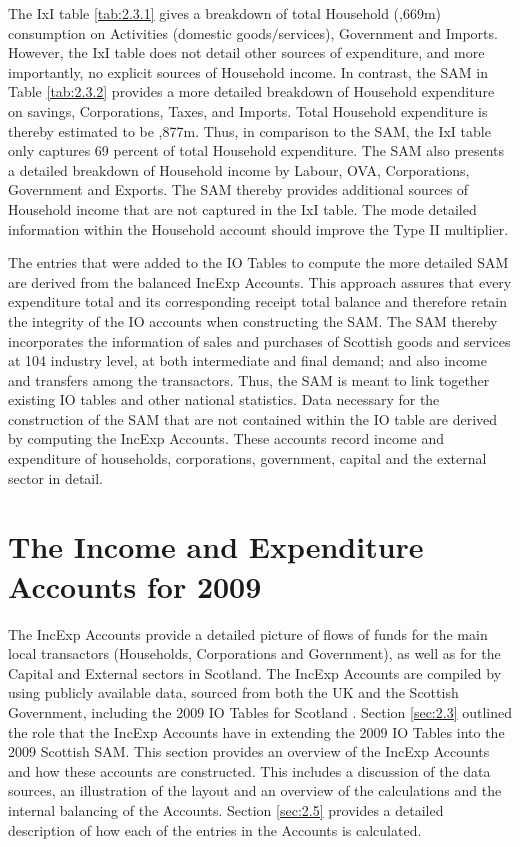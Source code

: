 \bigskip

The IxI table \ref{tab:2.3.1} gives a breakdown of total Household (,669m) consumption on Activities (domestic
goods$/$services), Government and Imports. However, the IxI table does not detail other sources of expenditure, and more importantly, no explicit sources of Household income. In contrast, the SAM in Table \ref{tab:2.3.2}
provides a more detailed breakdown of Household expenditure on savings, Corporations, Taxes, and Imports. Total Household expenditure is thereby estimated to be ,877m. Thus, in comparison to the SAM, the
IxI table only captures 69 percent of total Household expenditure. The SAM also presents a detailed breakdown of Household income by Labour, OVA, Corporations, Government and Exports. The SAM thereby provides additional sources of Household income that are not captured in the IxI table. The mode detailed information within the Household account should improve the Type II multiplier.

\bigskip

The entries that were added to the IO Tables to compute the more detailed SAM are derived from the balanced IncExp Accounts. This approach assures that every expenditure total and its corresponding receipt total balance and therefore retain the integrity of the IO accounts when constructing the SAM. The SAM thereby incorporates the information of sales and purchases of Scottish goods and services at 104 industry level, at both intermediate and final demand; and also income and  transfers among the transactors. Thus, the SAM is meant to link together existing IO tables and other national statistics. Data necessary for the construction of the SAM that are not contained within the IO table are derived by computing the IncExp Accounts. These accounts record income and expenditure of households, corporations, government, capital and the external sector in detail.


\newpage
\section{The Income and Expenditure Accounts for 2009}
\label{sec:2.4}

The IncExp Accounts provide a detailed picture of flows of funds for the main local transactors (Households, Corporations and Government), as well as for the Capital and External sectors in Scotland. The IncExp Accounts are compiled by using publicly available data, sourced from both the UK and the Scottish Government, including the 2009 IO Tables for Scotland \cite{ScottishGovernment2013a}. Section \ref{sec:2.3} outlined the role that the IncExp Accounts have in extending the 2009 IO Tables into the 2009 Scottish SAM. This section provides an overview of the IncExp Accounts and how these accounts are constructed. This includes a discussion of the data sources, an illustration of the layout and an overview of the calculations and the internal balancing of the Accounts. Section \ref{sec:2.5} provides a detailed description of how each of the entries in the Accounts is calculated.

